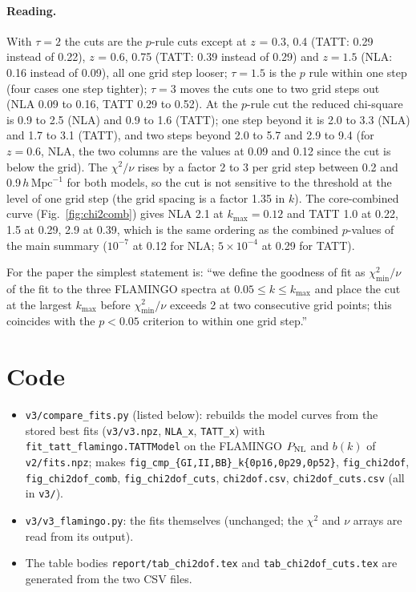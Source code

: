 \documentclass[11pt]{article}
\newcommand{\hmpc}{\,h\,\mathrm{Mpc}^{-1}}
\newcommand{\kmax}{k_{\max}}
\begin{document}
\paragraph{Reading.} With $\tau = 2$ the cuts are the $p$-rule cuts except at
$z$ = 0.3, 0.4 (TATT: 0.29 instead of 0.22), $z$ = 0.6, 0.75 (TATT: 0.39
instead of 0.29) and $z = 1.5$ (NLA: 0.16 instead of 0.09), all one grid step
looser; $\tau = 1.5$ is the $p$ rule within one step (four cases one step
tighter); $\tau = 3$ moves the cuts one to two grid steps out (NLA 0.09 to
0.16, TATT 0.29 to 0.52). At the $p$-rule
cut the reduced chi-square is 0.9 to 2.5 (NLA) and 0.9 to 1.6 (TATT); one
step beyond it is 2.0 to 3.3 (NLA) and 1.7 to 3.1 (TATT), and two steps
beyond 2.0 to 5.7 and 2.9 to 9.4 (for $z = 0.6$, NLA, the two columns are
the values at 0.09 and 0.12 since the cut is below the grid). The $\chi^2/\nu$ rises by a factor 2 to 3 per
grid step between 0.2 and 0.9$\hmpc$ for both models, so the cut is not
sensitive to the threshold at the level of one grid step (the grid spacing is
a factor 1.35 in $k$). The core-combined curve (Fig.~\ref{fig:chi2comb})
gives NLA 2.1 at $\kmax = 0.12$ and TATT 1.0 at 0.22, 1.5 at 0.29, 2.9 at
0.39, which is the same ordering as the combined $p$-values of the main
summary ($10^{-7}$ at 0.12 for NLA; $5 \times 10^{-4}$ at 0.29 for TATT).

For the paper the simplest statement is: ``we define the goodness of fit as
$\chi^2_{\min}/\nu$ of the fit to the three FLAMINGO spectra at
$0.05 \le k \le \kmax$ and place the cut at the largest $\kmax$ before
$\chi^2_{\min}/\nu$ exceeds 2 at two consecutive grid points; this coincides
with the $p < 0.05$ criterion to within one grid step.''

\section{Code}
\begin{itemize}\sloppy
\item \texttt{v3/compare\_fits.py} (listed below): rebuilds the model curves
  from the stored best fits (\texttt{v3/v3.npz}, \texttt{NLA\_x},
  \texttt{TATT\_x}) with \texttt{fit\_tatt\_flamingo.TATTModel} on the FLAMINGO
  $P_{\rm NL}$ and $b(k)$ of \texttt{v2/fits.npz}; makes
  \texttt{fig\_cmp\_\{GI,II,BB\}\_k\{0p16,0p29,0p52\}}, \texttt{fig\_chi2dof},
  \texttt{fig\_chi2dof\_comb}, \texttt{fig\_chi2dof\_cuts},
  \texttt{chi2dof.csv}, \texttt{chi2dof\_cuts.csv} (all in \texttt{v3/}).
\item \texttt{v3/v3\_flamingo.py}: the fits themselves (unchanged; the
  $\chi^2$ and $\nu$ arrays are read from its output).
\item The table bodies \texttt{report/tab\_chi2dof.tex} and
  \texttt{tab\_chi2dof\_cuts.tex} are generated from the two CSV files.
\end{itemize}

\end{document}
